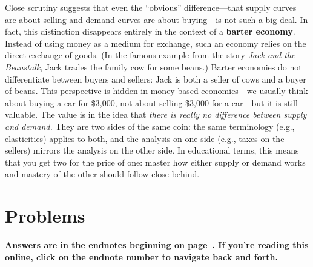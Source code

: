 Close scrutiny suggests that even the ``obvious'' difference---that supply curves are about selling and demand curves are about buying---is not such a big deal. In fact, this distinction disappears entirely in the context of a \textbf{barter economy}. Instead of using money as a medium for exchange, such an economy relies on the direct exchange of goods. (In the famous example from the story \emph{Jack and the Beanstalk}, Jack trades the family cow for some beans.) Barter economies do not differentiate between buyers and sellers: Jack is both a seller of cows and a buyer of beans. This perspective is hidden in money-based economies---we usually think about buying a car for \$3,000, not about selling \$3,000 for a car---but it is still valuable. The value is in the idea that \emph{there is really no difference between supply and demand.} They are two sides of the same coin: the same terminology (e.g., elasticities) applies to both, and the analysis on one side (e.g., taxes on the sellers) mirrors the analysis on the other side. In educational terms, this means that you get two for the price of one: master how either supply or demand works and mastery of the other should follow close behind.

%
%
%



\bigskip
\bigskip
\section*{Problems}

\noindent \textbf{Answers are in the endnotes beginning on page~\pageref{3detailsa}. If you're reading this online, click on the endnote number to navigate back and forth.}



